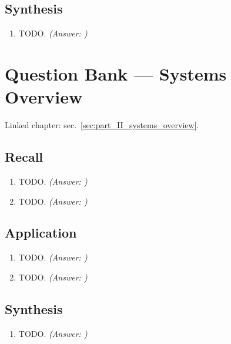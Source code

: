 \documentclass[
]{article}
\theoremstyle{plain}
\theoremstyle{definition}
\begin{document}
\subsection{Synthesis}\label{synthesis-5}

\begin{enumerate}
\def\labelenumi{\arabic{enumi}.}
\setcounter{enumi}{4}
\item
  TODO. \emph{(Answer: )}
\end{enumerate}

\newpage

\section{Question Bank --- Systems
Overview}\label{sec:q_part_II_systems_overview}

Linked chapter: sec.~\ref{sec:part_II_systems_overview}.

\subsection{Recall}\label{recall-6}

\begin{enumerate}
\def\labelenumi{\arabic{enumi}.}
\item
  TODO. \emph{(Answer: )}
\item
  TODO. \emph{(Answer: )}
\end{enumerate}

\subsection{Application}\label{application-6}

\begin{enumerate}
\def\labelenumi{\arabic{enumi}.}
\setcounter{enumi}{2}
\item
  TODO. \emph{(Answer: )}
\item
  TODO. \emph{(Answer: )}
\end{enumerate}

\subsection{Synthesis}\label{synthesis-6}

\begin{enumerate}
\def\labelenumi{\arabic{enumi}.}
\setcounter{enumi}{4}
\item
  TODO. \emph{(Answer: )}
\end{enumerate}
\end{document}
